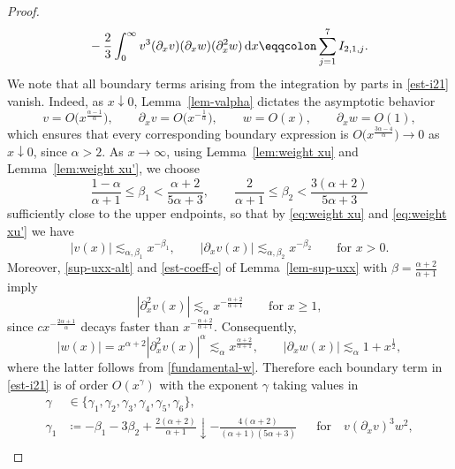 \documentclass[reqno,12pt]{amsart}
\renewcommand{\d}{\ensuremath{\mathrm{d}}}
\renewcommand{\d}{\ensuremath{{\rm d}}}
\numberwithin{equation}{section}
\begin{document}
\begin{proof}
\begin{align}
&\phantom{=} - \frac 2 3 \int_0^\infty v^3 (\partial_x v) (\partial_x w) (\partial_x^2 w) \, \d x \eqqcolon \sum_{j = 1}^7 I_{2,1,j}. \label{est-i21}
\end{align}
%
We note that all boundary terms arising from the integration by parts in \eqref{est-i21} vanish. Indeed, as $x\downarrow0$,
Lemma~\ref{lem-valpha} dictates the asymptotic behavior
%
\begin{equation*}
v=O\big(x^{\frac{\alpha-1}{\alpha}}\big),\qquad
\partial_x v=O\big(x^{-\frac1\alpha}\big),\qquad
w=O(x),\qquad
\partial_x w=O(1),
\end{equation*}
%
which ensures that every corresponding boundary expression is 
$O\big(x^{\frac{3\alpha-4}{\alpha}}\big)\to 0$ as 
$x\downarrow0$,
since $\alpha>2$.
As $x\to\infty$, using Lemma~\ref{lem:weight xu} and Lemma~\ref{lem:weight xu'}, we choose
%
\begin{equation*}
\frac{1-\alpha}{\alpha+1} \le \beta_1 < \frac{\alpha+2}{5\alpha+3},
\qquad
\frac{2}{\alpha+1} \le \beta_2 < \frac{3(\alpha+2)}{5\alpha+3}
\end{equation*}
%
sufficiently close to the upper endpoints, so that by \eqref{eq:weight xu} and \eqref{eq:weight xu'} we have
%
\begin{equation*}
|v(x)|\lesssim_{\alpha, \beta_1} x^{-\beta_1},
\qquad
|\partial_x v(x)|\lesssim_{\alpha, \beta_2} x^{-\beta_2}
\qquad\text{for }x>0. 
\end{equation*}
%
Moreover, \eqref{sup-uxx-alt} and \eqref{est-coeff-c} of Lemma~\ref{lem-sup-uxx} with $\beta=\frac{\alpha+2}{\alpha+1}$ imply
%
\begin{equation*}
|\partial_x^2 v(x)|\lesssim_\alpha x^{-\frac{\alpha+2}{\alpha+1}}
\qquad \text{for }x \geq 1,
\end{equation*}
%
since $c x^{-\frac{2 \alpha+1}{\alpha}}$ decays faster than $x^{-\frac{\alpha+2}{\alpha+1}}$. Consequently,
%
\begin{equation*}
|w(x)|=x^{\alpha+2}|\partial_x^2 v(x)|^\alpha
\lesssim_\alpha x^{\frac{\alpha+2}{\alpha+1}},
\qquad
|\partial_x w(x)|\lesssim_\alpha 1+x^{\frac{1}{2}},
\end{equation*}
%
where the latter follows from \eqref{fundamental-w}. Therefore each boundary term in
\eqref{est-i21} is of order $O(x^\gamma)$ with the exponent $\gamma$ taking values in 
%
\begin{align*}
\gamma &\in \{\gamma_1,\gamma_2,\gamma_3,\gamma_4,\gamma_5,\gamma_6\}, \\
\gamma_1 &\coloneq -\beta_1-3\beta_2+\frac{2(\alpha+2)}{\alpha+1} \downarrow - \frac{4 (\alpha+2)}{(\alpha+1) (5\alpha+3)} && \text{for} \quad v(\partial_x v)^3 w^2, \\

\end{align*}
\end{proof}
\end{document}
